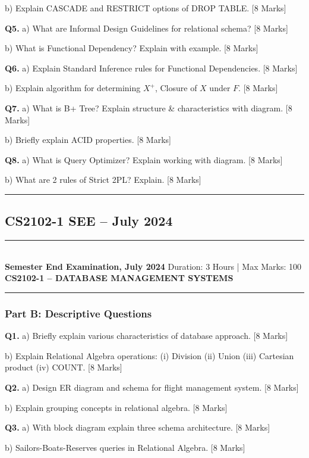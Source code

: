\documentclass[11pt,a4paper]{article}
\newcommand{\examheader}[4]{
\noindent\rule{\textwidth}{0.5pt}\\
\textbf{#1} \hfill Duration: #3 | Max Marks: #4\\
\textbf{#2}\\
\rule{\textwidth}{0.5pt}
\vspace{0.2cm}
}
\begin{document}
b) Explain CASCADE and RESTRICT options of DROP TABLE. \hfill [8 Marks]

\textbf{Q5.} a) What are Informal Design Guidelines for relational schema? \hfill [8 Marks]

b) What is Functional Dependency? Explain with example. \hfill [8 Marks]

\textbf{Q6.} a) Explain Standard Inference rules for Functional Dependencies. \hfill [8 Marks]

b) Explain algorithm for determining $X^+$, Closure of $X$ under $F$. \hfill [8 Marks]

\textbf{Q7.} a) What is B+ Tree? Explain structure \& characteristics with diagram. \hfill [8 Marks]

b) Briefly explain ACID properties. \hfill [8 Marks]

\textbf{Q8.} a) What is Query Optimizer? Explain working with diagram. \hfill [8 Marks]

b) What are 2 rules of Strict 2PL? Explain. \hfill [8 Marks]

\vspace{0.5cm}
\hrule
\vspace{0.5cm}

\subsection{CS2102-1 SEE -- July 2024}
\examheader{Semester End Examination, July 2024}{CS2102-1 -- DATABASE MANAGEMENT SYSTEMS}{3 Hours}{100}

\subsubsection*{Part B: Descriptive Questions}

\textbf{Q1.} a) Briefly explain various characteristics of database approach. \hfill [8 Marks]

b) Explain Relational Algebra operations: (i) Division (ii) Union (iii) Cartesian product (iv) COUNT. \hfill [8 Marks]

\textbf{Q2.} a) Design ER diagram and schema for flight management system. \hfill [8 Marks]

b) Explain grouping concepts in relational algebra. \hfill [8 Marks]

\textbf{Q3.} a) With block diagram explain three schema architecture. \hfill [8 Marks]

b) Sailors-Boats-Reserves queries in Relational Algebra. \hfill [8 Marks]
\end{document}
